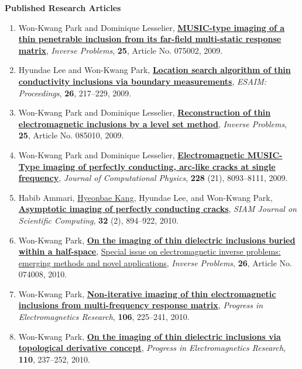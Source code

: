 \documentclass[10pt,A4]{article}
\newcommand{\cvsection}[1]
{
	\begin{center}
		\large\textcolor{sectcol}{\textbf{#1}}
	\end{center}
}
\begin{document}
\cvsection{Published Research Articles}
\begin{enumerate}\renewcommand{\theenumi}{[A\arabic{enumi}]}
\renewcommand{\labelenumi}{\theenumi}
\item\label{A-IP2009A} Won-Kwang Park and Dominique Lesselier, \href{http://dx.doi.org/10.1088/0266-5611/25/7/075002}{\textbf{MUSIC-type imaging of a thin penetrable inclusion from its far-field multi-static response matrix}}, \textit{Inverse Problems}, \textbf{25}, Article No. 075002, 2009.
\item\label{A-ESAIM2009} Hyundae Lee and Won-Kwang Park, \href{http://dx.doi.org/10.1051/proc/2009015}{\textbf{Location search algorithm of thin conductivity inclusions via boundary measurements}}, \textit{ESAIM: Proceedings}, \textbf{26}, 217--229, 2009.
\item\label{A-IP2009B} Won-Kwang Park and Dominique Lesselier, \href{http://dx.doi.org/10.1088/0266-5611/25/8/085010}{\textbf{Reconstruction of thin electromagnetic inclusions by a level set method}}, \textit{Inverse Problems}, \textbf{25}, Article No. 085010, 2009.
\item\label{A-JCOMP2009} Won-Kwang Park and Dominique Lesselier, \href{http://dx.doi.org/10.1016/j.jcp.2009.07.026}{\textbf{Electromagnetic MUSIC-Type imaging of perfectly conducting, arc-like cracks at single frequency}}, \textit{Journal of Computational Physics}, \textbf{228} (21), 8093--8111, 2009.
\item\label{A-SIAP2010} Habib Ammari, \href{http://people.math.inha.ac.kr/~hbkang/}{Hyeonbae Kang}, Hyundae Lee, and Won-Kwang Park, \href{http://dx.doi.org/10.1137/090749013}{\textbf{Asymptotic imaging of perfectly conducting cracks}}, \textit{SIAM Journal on Scientific Computing}, \textbf{32} (2), 894--922, 2010.
\item\label{A-IP2010} Won-Kwang Park, \href{http://dx.doi.org/10.1088/0266-5611/26/7/074008}{\textbf{On the imaging of thin dielectric inclusions buried within a half-space}}, \href{http://iopscience.iop.org/0266-5611/26/7}{Special issue on electromagnetic inverse problems: emerging methods and novel applications}, \textit{Inverse Problems}, \textbf{26}, Article No. 074008, 2010.
\item\label{A-PIER2010A} Won-Kwang Park, \href{http://dx.doi.org/10.2528/PIER10052506}{\textbf{Non-iterative imaging of thin electromagnetic inclusions from multi-frequency response matrix}}, \textit{Progress in Electromagnetics Research}, \textbf{106}, 225--241, 2010.
\item\label{A-PIER2010B} Won-Kwang Park, \href{http://dx.doi.org/10.2528/PIER10101305}{\textbf{On the imaging of thin dielectric inclusions via topological derivative concept}}, \textit{Progress in Electromagnetics Research}, \textbf{110}, 237--252, 2010.

\end{enumerate}
\end{document}
